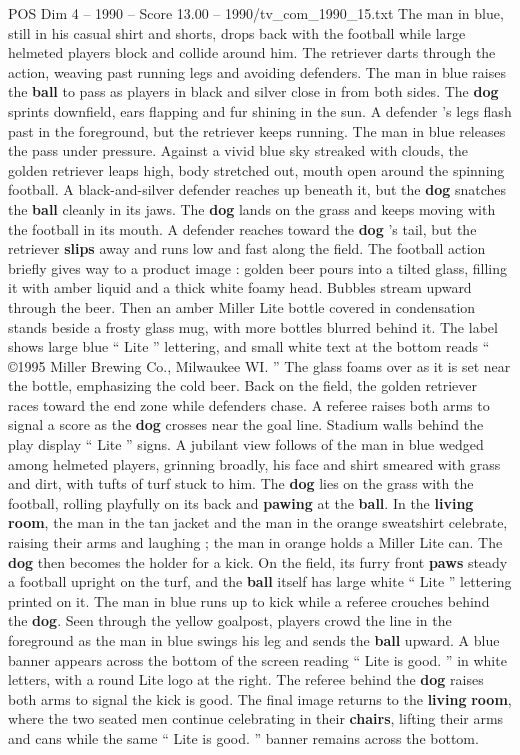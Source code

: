 \begin{textsample}{POS Dim 4 – 1990 – Score 13.00 – 1990/tv\_com\_1990\_15.txt}
The man in blue, still in his casual shirt and shorts, drops back with the football while large helmeted players block and collide around him.
The retriever darts through the action, weaving past running legs and avoiding defenders.
The man in blue raises the \textbf{ball} to pass as players in black and silver close in from both sides.
The \textbf{dog} sprints downfield, ears flapping and fur shining in the sun.
A defender ’s legs flash past in the foreground, but the retriever keeps running.
The man in blue releases the pass under pressure.
Against a vivid blue sky streaked with clouds, the golden retriever leaps high, body stretched out, mouth open around the spinning football.
A black-and-silver defender reaches up beneath it, but the \textbf{dog} snatches the \textbf{ball} cleanly in its jaws.
The \textbf{dog} lands on the grass and keeps moving with the football in its mouth.
A defender reaches toward the \textbf{dog} ’s tail, but the retriever \textbf{slips} away and runs low and fast along the field.
The football action briefly gives way to a product image : golden beer pours into a tilted glass, filling it with amber liquid and a thick white foamy head.
Bubbles stream upward through the beer.
Then an amber Miller Lite bottle covered in condensation stands beside a frosty glass mug, with more bottles blurred behind it.
The label shows large blue “ Lite ” lettering, and small white text at the bottom reads “ {\EmojiFont ©}1995 Miller Brewing Co., Milwaukee WI. ” The glass foams over as it is set near the bottle, emphasizing the cold beer.
Back on the field, the golden retriever races toward the end zone while defenders chase.
A referee raises both arms to signal a score as the \textbf{dog} crosses near the goal line.
Stadium walls behind the play display “ Lite ” signs.
A jubilant view follows of the man in blue wedged among helmeted players, grinning broadly, his face and shirt smeared with grass and dirt, with tufts of turf stuck to him.
The \textbf{dog} lies on the grass with the football, rolling playfully on its back and \textbf{pawing} at the \textbf{ball}.
In the \textbf{living} \textbf{room}, the man in the tan jacket and the man in the orange sweatshirt celebrate, raising their arms and laughing ; the man in orange holds a Miller Lite can.
The \textbf{dog} then becomes the holder for a kick.
On the field, its furry front \textbf{paws} steady a football upright on the turf, and the \textbf{ball} itself has large white “ Lite ” lettering printed on it.
The man in blue runs up to kick while a referee crouches behind the \textbf{dog}.
Seen through the yellow goalpost, players crowd the line in the foreground as the man in blue swings his leg and sends the \textbf{ball} upward.
A blue banner appears across the bottom of the screen reading “ Lite is good. ” in white letters, with a round Lite logo at the right.
The referee behind the \textbf{dog} raises both arms to signal the kick is good.
The final image returns to the \textbf{living} \textbf{room}, where the two seated men continue celebrating in their \textbf{chairs}, lifting their arms and cans while the same “ Lite is good. ” banner remains across the bottom.

\end{textsample}
